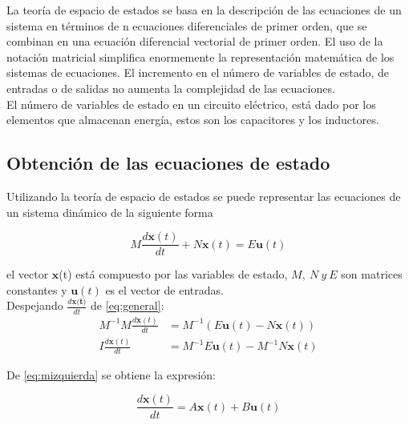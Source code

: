 \documentclass[10pt,a4paper]{article} %
\begin{document}
	La teoría de espacio de estados se basa en la descripción de las ecuaciones de un sistema en términos de n ecuaciones diferenciales de primer orden, que se combinan en una ecuación diferencial vectorial de primer orden. El uso de la notación matricial simplifica enormemente la representación matemática de los sistemas de ecuaciones. El incremento en el número de variables de estado, de entradas o de salidas no aumenta la complejidad de las ecuaciones.\\
	
	 El número de variables de estado en un circuito eléctrico, está dado por los elementos
	que almacenan energía, estos son los capacitores y los inductores. 
	
	\subsection{Obtención de las ecuaciones de estado}
	Utilizando la teoría de espacio de estados se puede representar las ecuaciones de un sistema dinámico de la siguiente forma
	
	\begin{equation}
		M\frac{d\textbf{x}(t)}{dt}+N\textbf{x}(t)=E\textbf{u}(t)\label{eq:general}
	\end{equation}
	
	el vector $\textbf{x}$(t) está compuesto por las variables de estado, $M,\ N\ y\ E$ son matrices constantes y $\textbf{u}(t)$ es el vector de entradas.\\
	
	Despejando $\frac{d\textbf{x(t)}}{dt}$ de \ref{eq:general}:
	\begin{align}
		M^{-1}M\frac{d\textbf{x}(t)}{dt}&=M^{-1}\left(E\textbf{u}(t)-N\textbf{x}(t)\right)\nonumber\\
		I\frac{d\textbf{x}(t)}{dt}&=M^{-1} E\textbf{u}(t)- M^{-1} N\textbf{x}(t)\label{eq:mizquierda}
	\end{align}
	
	De \ref{eq:mizquierda} se obtiene la expresión:
	
	\begin{equation}
		\frac{d\textbf{x}(t)}{dt}=A\textbf{x}(t)+B\textbf{u}(t) \label{eq:normalizada}
	\end{equation}
	
\end{document}
